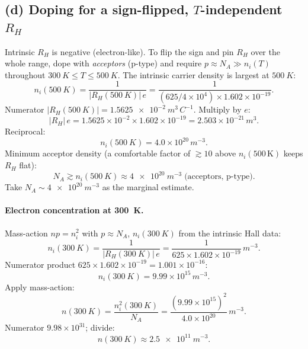 \documentclass[11pt]{article}
\begin{document}
\subsection*{(d) Doping for a sign-flipped, $T$-independent $R_{H}$}

Intrinsic $R_{H}$ is negative (electron-like). To flip the sign and pin $R_{H}$ over the whole range, dope with \emph{acceptors} (p-type) and require $p\approx N_{A}\gg n_{i}(T)$ throughout $\SI{300}{K}\le T\le\SI{500}{K}$. The intrinsic carrier density is largest at $\SI{500}{K}$:
\[
n_{i}(\SI{500}{K}) = \frac{1}{|R_{H}(\SI{500}{K})|\,e} = \frac{1}{(625/4\times 10^{4})\times 1.602\times 10^{-19}}.
\]
Numerator $|R_{H}(\SI{500}{K})| = \SI{1.5625e-2}{m^{3}\,C^{-1}}$. Multiply by $e$:
\[
|R_{H}|\,e = 1.5625\times 10^{-2}\times 1.602\times 10^{-19} = 2.503\times 10^{-21}\,\si{m^{3}}.
\]
Reciprocal:
\[
n_{i}(\SI{500}{K}) = 4.0\times 10^{20}\,\si{m^{-3}}.
\]
Minimum acceptor density (a comfortable factor of $\gtrsim 10$ above $n_{i}(500\,\mathrm{K})$ keeps $R_{H}$ flat):
\[
\boxed{\;N_{A}\gtrsim n_{i}(\SI{500}{K})\approx \SI{4e20}{m^{-3}}\;\text{(acceptors, p-type).}\;}
\]
Take $N_{A}\sim\SI{4e20}{m^{-3}}$ as the marginal estimate.

\paragraph{Electron concentration at \SI{300}{K}.} Mass-action $np = n_{i}^{2}$ with $p\approx N_{A}$, $n_{i}(\SI{300}{K})$ from the intrinsic Hall data:
\[
n_{i}(\SI{300}{K}) = \frac{1}{|R_{H}(\SI{300}{K})|\,e} = \frac{1}{625\times 1.602\times 10^{-19}}\,\si{m^{-3}}.
\]
Numerator product $625\times 1.602\times 10^{-19} = 1.001\times 10^{-16}$:
\[
n_{i}(\SI{300}{K}) = 9.99\times 10^{15}\,\si{m^{-3}}.
\]
Apply mass-action:
\[
n(\SI{300}{K}) = \frac{n_{i}^{2}(\SI{300}{K})}{N_{A}} = \frac{(9.99\times 10^{15})^{2}}{4.0\times 10^{20}}\,\si{m^{-3}}.
\]
Numerator $9.98\times 10^{31}$; divide:
\[
\boxed{\;n(\SI{300}{K}) \approx \SI{2.5e11}{m^{-3}}.\;}
\]
\end{document}
